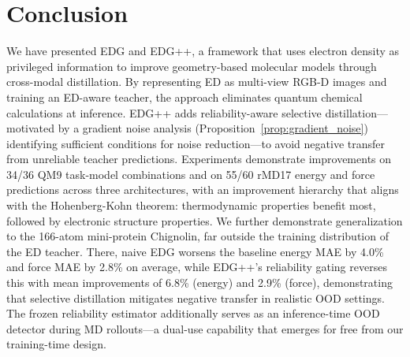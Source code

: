 \section{Conclusion}
\label{sec:Conclusion}

We have presented EDG and EDG++, a framework that uses electron density as privileged information to improve geometry-based molecular models through cross-modal distillation. By representing ED as multi-view RGB-D images and training an ED-aware teacher, the approach eliminates quantum chemical calculations at inference. EDG++ adds reliability-aware selective distillation---motivated by a gradient noise analysis (Proposition~\ref{prop:gradient_noise}) identifying sufficient conditions for noise reduction---to avoid negative transfer from unreliable teacher predictions. %
Experiments demonstrate improvements on 34/36 QM9 task-model combinations and on 55/60 rMD17 energy and force predictions across three architectures, with an improvement hierarchy that aligns with the Hohenberg-Kohn theorem: thermodynamic properties benefit most, followed by electronic structure properties. We further demonstrate generalization to the 166-atom mini-protein Chignolin, far outside the training distribution of the ED teacher. There, naive EDG worsens the baseline energy MAE by 4.0\% and force MAE by 2.8\% on average, while EDG++'s reliability gating reverses this with mean improvements of 6.8\% (energy) and 2.9\% (force), demonstrating that selective distillation mitigates negative transfer in realistic OOD settings. The frozen reliability estimator additionally serves as an inference-time OOD detector during MD rollouts---a dual-use capability that emerges for free from our training-time design.

